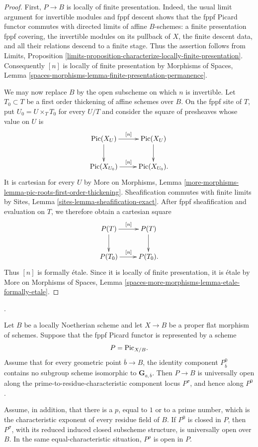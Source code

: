 \begin{proof}
First, $P \to B$ is locally of finite presentation. Indeed, the usual limit
argument for invertible modules and fppf descent shows that the fppf Picard
functor commutes with directed limits of affine $B$-schemes: a finite
presentation fppf covering, the invertible modules on its pullback of $X$,
the finite descent data, and all their relations descend to a finite stage.
Thus the assertion follows from Limits, Proposition
\ref{limits-proposition-characterize-locally-finite-presentation}.
Consequently $[n]$ is locally of finite presentation by Morphisms of Spaces,
Lemma \ref{spaces-morphisms-lemma-finite-presentation-permanence}.

We may now replace $B$ by the open subscheme on which $n$ is invertible. Let
$T_0 \subset T$ be a first order thickening of affine schemes over $B$. On
the fppf site of $T$, put $U_0=U\times_TT_0$ for every $U/T$ and consider
the square of presheaves whose value on $U$ is
$$
\xymatrix{
\Pic(X_U) \ar[r]^{[n]} \ar[d] & \Pic(X_U) \ar[d] \\
\Pic(X_{U_0}) \ar[r]^{[n]} & \Pic(X_{U_0}).
}
$$
It is cartesian for every $U$ by More on Morphisms, Lemma
\ref{more-morphisms-lemma-pic-roots-first-order-thickening}. Sheafification
commutes with finite limits by Sites, Lemma
\ref{sites-lemma-sheafification-exact}. After fppf sheafification and
evaluation on $T$, we therefore obtain a cartesian square
$$
\xymatrix{
P(T) \ar[r]^{[n]} \ar[d] & P(T) \ar[d] \\
P(T_0) \ar[r]^{[n]} & P(T_0).
}
$$
Thus $[n]$ is formally \'etale. Since it is locally of finite presentation,
it is \'etale by More on Morphisms of Spaces, Lemma
\ref{spaces-more-morphisms-lemma-etale-formally-etale}.
\end{proof}

\begin{lemma}
\label{corollary-picard-prime-to-characteristic-openness}
\begin{reference}
\cite[Expos\'e 236, corollary following Lemma 2.6,
pp. 233--234]{FGA}.
\end{reference}
Let $B$ be a locally Noetherian scheme and let $X\to B$ be a proper flat
morphism of schemes. Suppose that the fppf Picard functor is represented by a
scheme
$$
P=\mathrm{Pic}_{X/B}.
$$
Assume that for every geometric point $\overline{b}\to B$, the identity
component $P_{\overline{b}}^0$ contains no subgroup scheme isomorphic to
$\mathbf G_{a,\overline{b}}$. Then $P\to B$ is universally open along the
prime-to-residue-characteristic component locus $P^\sigma$, and hence along
$P^0$.

Assume, in addition, that there is a $p$, equal to $1$ or to a prime number,
which is the characteristic exponent of every residue field of $B$. If $P^0$
is closed in $P$, then $P^\sigma$, with its reduced induced closed subscheme
structure, is universally open over $B$. In the same equal-characteristic
situation, $P^\rho$ is open in $P$.
\end{lemma}

